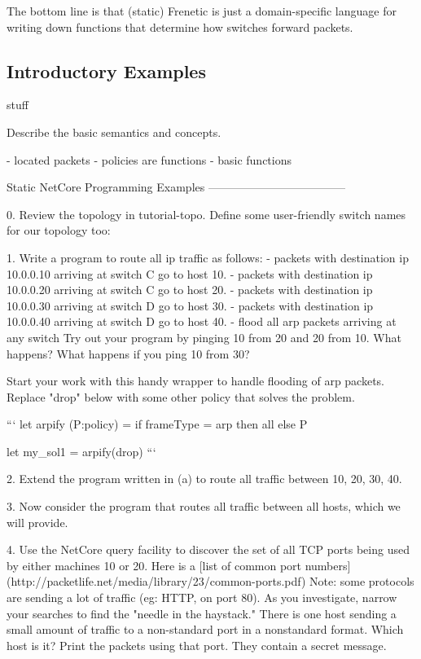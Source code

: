 \documentclass{article}
\begin{document}
The bottom line is that (static) Frenetic is just a domain-specific
language for writing down functions that determine how switches
forward packets.

\subsection{Introductory Examples}

\begin{progeg}
stuff
\end{progeg}

Describe the basic semantics and concepts.

- located packets
- policies are functions
- basic functions


Static NetCore Programming Examples
------------------------------------

0. Review the topology in tutorial-topo.  Define some user-friendly switch names for our topology too:

1. Write a program to route all ip traffic as follows: 
  - packets with destination ip 10.0.0.10 arriving at switch C go to host 10.  
  - packets with destination ip 10.0.0.20 arriving at switch C go to host 20.  
  - packets with destination ip 10.0.0.30 arriving at switch D go to host 30.  
  - packets with destination ip 10.0.0.40 arriving at switch D go to host 40.  
  - flood all arp packets arriving at any switch
Try out your program by pinging 10 from 20 and 20 from 10.  What happens?
What happens if you ping 10 from 30?

Start your work with this handy wrapper to handle flooding of arp packets.
Replace "drop" below with some other policy that solves the problem.

```
let arpify (P:policy) =
  if frameType = arp then all
  else P
  
let my_sol1 = arpify(drop)
```

2. Extend the program written in (a) to route all traffic between
10, 20, 30, 40.

3. Now consider the program that routes all traffic between all hosts,
which we will provide.

4. Use the NetCore query facility to discover the set of all TCP ports 
being used by either machines 10 or 20.  Here is a [list of common port
numbers](http://packetlife.net/media/library/23/common-ports.pdf)
Note: some protocols are sending a lot of traffic (eg: HTTP, on port
80).  As you investigate, narrow your searches to find the "needle in
the haystack."  There is one host sending a small amount of traffic to
a non-standard port in a nonstandard format.  Which host is it?  Print
the packets using that port.  They contain a secret message.
\end{document}
